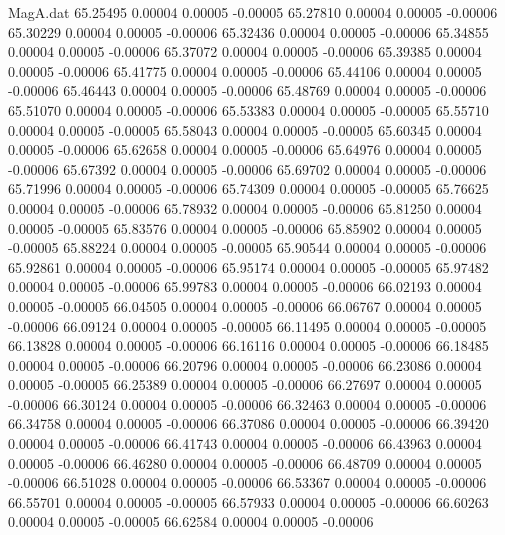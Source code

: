 \begin{filecontents}{MagA.dat}
  65.25495    0.00004    0.00005   -0.00005
  65.27810    0.00004    0.00005   -0.00006
  65.30229    0.00004    0.00005   -0.00006
  65.32436    0.00004    0.00005   -0.00006
  65.34855    0.00004    0.00005   -0.00006
  65.37072    0.00004    0.00005   -0.00006
  65.39385    0.00004    0.00005   -0.00006
  65.41775    0.00004    0.00005   -0.00006
  65.44106    0.00004    0.00005   -0.00006
  65.46443    0.00004    0.00005   -0.00006
  65.48769    0.00004    0.00005   -0.00006
  65.51070    0.00004    0.00005   -0.00006
  65.53383    0.00004    0.00005   -0.00005
  65.55710    0.00004    0.00005   -0.00005
  65.58043    0.00004    0.00005   -0.00005
  65.60345    0.00004    0.00005   -0.00006
  65.62658    0.00004    0.00005   -0.00006
  65.64976    0.00004    0.00005   -0.00006
  65.67392    0.00004    0.00005   -0.00006
  65.69702    0.00004    0.00005   -0.00006
  65.71996    0.00004    0.00005   -0.00006
  65.74309    0.00004    0.00005   -0.00005
  65.76625    0.00004    0.00005   -0.00006
  65.78932    0.00004    0.00005   -0.00006
  65.81250    0.00004    0.00005   -0.00005
  65.83576    0.00004    0.00005   -0.00006
  65.85902    0.00004    0.00005   -0.00005
  65.88224    0.00004    0.00005   -0.00005
  65.90544    0.00004    0.00005   -0.00006
  65.92861    0.00004    0.00005   -0.00006
  65.95174    0.00004    0.00005   -0.00005
  65.97482    0.00004    0.00005   -0.00006
  65.99783    0.00004    0.00005   -0.00006
  66.02193    0.00004    0.00005   -0.00005
  66.04505    0.00004    0.00005   -0.00006
  66.06767    0.00004    0.00005   -0.00006
  66.09124    0.00004    0.00005   -0.00005
  66.11495    0.00004    0.00005   -0.00005
  66.13828    0.00004    0.00005   -0.00006
  66.16116    0.00004    0.00005   -0.00006
  66.18485    0.00004    0.00005   -0.00006
  66.20796    0.00004    0.00005   -0.00006
  66.23086    0.00004    0.00005   -0.00005
  66.25389    0.00004    0.00005   -0.00006
  66.27697    0.00004    0.00005   -0.00006
  66.30124    0.00004    0.00005   -0.00006
  66.32463    0.00004    0.00005   -0.00006
  66.34758    0.00004    0.00005   -0.00006
  66.37086    0.00004    0.00005   -0.00006
  66.39420    0.00004    0.00005   -0.00006
  66.41743    0.00004    0.00005   -0.00006
  66.43963    0.00004    0.00005   -0.00006
  66.46280    0.00004    0.00005   -0.00006
  66.48709    0.00004    0.00005   -0.00006
  66.51028    0.00004    0.00005   -0.00006
  66.53367    0.00004    0.00005   -0.00006
  66.55701    0.00004    0.00005   -0.00005
  66.57933    0.00004    0.00005   -0.00006
  66.60263    0.00004    0.00005   -0.00005
  66.62584    0.00004    0.00005   -0.00006

\end{filecontents}
